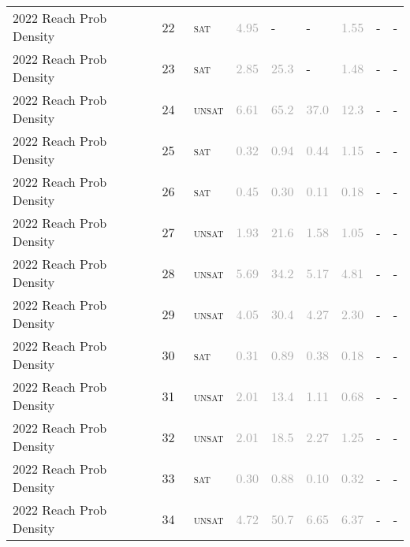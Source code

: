 \begin{center}
{\begin{longtable}{@{}lllllllll@{}}
2022 Reach Prob Density & 22 & ~\textsc{sat} & \textcolor{darkgray}{4.95} & - & - & \textcolor{darkgray}{1.55} & - & - \\
2022 Reach Prob Density & 23 & ~\textsc{sat} & \textcolor{darkgray}{2.85} & \textcolor{darkgray}{25.3} & - & \textcolor{darkgray}{1.48} & - & - \\
2022 Reach Prob Density & 24 & ~\textsc{unsat} & \textcolor{darkgray}{6.61} & \textcolor{darkgray}{65.2} & \textcolor{darkgray}{37.0} & \textcolor{darkgray}{12.3} & - & - \\
2022 Reach Prob Density & 25 & ~\textsc{sat} & \textcolor{darkgray}{0.32} & \textcolor{darkgray}{0.94} & \textcolor{darkgray}{0.44} & \textcolor{darkgray}{1.15} & - & - \\
2022 Reach Prob Density & 26 & ~\textsc{sat} & \textcolor{darkgray}{0.45} & \textcolor{darkgray}{0.30} & \textcolor{darkgray}{0.11} & \textcolor{darkgray}{0.18} & - & - \\
2022 Reach Prob Density & 27 & ~\textsc{unsat} & \textcolor{darkgray}{1.93} & \textcolor{darkgray}{21.6} & \textcolor{darkgray}{1.58} & \textcolor{darkgray}{1.05} & - & - \\
2022 Reach Prob Density & 28 & ~\textsc{unsat} & \textcolor{darkgray}{5.69} & \textcolor{darkgray}{34.2} & \textcolor{darkgray}{5.17} & \textcolor{darkgray}{4.81} & - & - \\
2022 Reach Prob Density & 29 & ~\textsc{unsat} & \textcolor{darkgray}{4.05} & \textcolor{darkgray}{30.4} & \textcolor{darkgray}{4.27} & \textcolor{darkgray}{2.30} & - & - \\
2022 Reach Prob Density & 30 & ~\textsc{sat} & \textcolor{darkgray}{0.31} & \textcolor{darkgray}{0.89} & \textcolor{darkgray}{0.38} & \textcolor{darkgray}{0.18} & - & - \\
2022 Reach Prob Density & 31 & ~\textsc{unsat} & \textcolor{darkgray}{2.01} & \textcolor{darkgray}{13.4} & \textcolor{darkgray}{1.11} & \textcolor{darkgray}{0.68} & - & - \\
2022 Reach Prob Density & 32 & ~\textsc{unsat} & \textcolor{darkgray}{2.01} & \textcolor{darkgray}{18.5} & \textcolor{darkgray}{2.27} & \textcolor{darkgray}{1.25} & - & - \\
2022 Reach Prob Density & 33 & ~\textsc{sat} & \textcolor{darkgray}{0.30} & \textcolor{darkgray}{0.88} & \textcolor{darkgray}{0.10} & \textcolor{darkgray}{0.32} & - & - \\
2022 Reach Prob Density & 34 & ~\textsc{unsat} & \textcolor{darkgray}{4.72} & \textcolor{darkgray}{50.7} & \textcolor{darkgray}{6.65} & \textcolor{darkgray}{6.37} & - & - \\

\end{longtable}}
\end{center}
